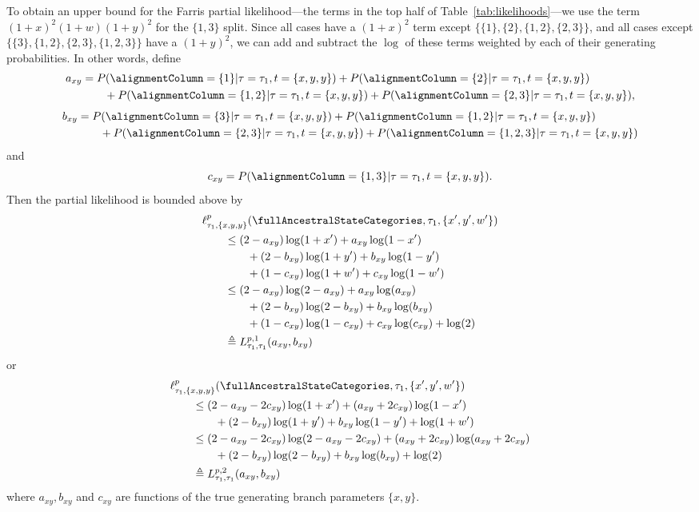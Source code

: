 To obtain an upper bound for the Farris partial likelihood---the terms in the top half of Table~\ref{tab:likelihoods}---we use the term $(1+x)^2(1+w)(1+y)^2$ for the $\{1,3\}$ split.
Since all cases have a $(1+x)^2$ term except $\{\{1\}, \{2\}, \{1,2\}, \{2,3\}\}$, and all cases except $\{\{3\}, \{1,2\}, \{2,3\}, \{1,2,3\}\}$ have a $(1+y)^2$, we can add and subtract the $\log$ of these terms weighted by each of their generating probabilities.
In other words, define
\begin{align*}
    a_{xy} &= P(\alignmentColumn=\{1\}|\tau=\tau_1,t=\{x,y,y\})
    +        P(\alignmentColumn=\{2\}|\tau=\tau_1,t=\{x,y,y\}) \\
    &\qquad + P(\alignmentColumn=\{1,2\}|\tau=\tau_1,t=\{x,y,y\})
    + P(\alignmentColumn=\{2,3\}|\tau=\tau_1,t=\{x,y,y\}),
\end{align*}
\begin{align*}
    b_{xy} &= P(\alignmentColumn=\{3\}|\tau=\tau_1,t=\{x,y,y\}) + P(\alignmentColumn=\{1,2\}|\tau=\tau_1,t=\{x,y,y\}) \\
           &\qquad + P(\alignmentColumn=\{2,3\}|\tau=\tau_1,t=\{x,y,y\}) + P(\alignmentColumn=\{1,2,3\}|\tau=\tau_1,t=\{x,y,y\})
\end{align*}
and
\begin{equation*}
    c_{xy} = P(\alignmentColumn=\{1,3\}|\tau=\tau_1,t=\{x,y,y\}).
\end{equation*}
Then the partial likelihood is bounded above by
\begin{align*}
    & \ell^p_{\tau_1,\{x,y,y\}}(\fullAncestralStateCategories,\tau_1,\{x',y',w'\}) \\
    &\qquad \le (2-a_{xy})\log(1+x')+a_{xy}\log(1-x')\\
    &\qquad \qquad +(2-b_{xy})\log(1+y')+b_{xy}\log(1-y')\\
    &\qquad \qquad +(1-c_{xy})\log(1+w')+c_{xy}\log(1-w') \\
    &\qquad \le (2-a_{xy})\log(2-a_{xy})+a_{xy}\log(a_{xy})\\
    &\qquad \qquad +(2-b_{xy})\log(2-b_{xy})+b_{xy}\log(b_{xy})\\
    &\qquad \qquad +(1-c_{xy})\log(1-c_{xy})+c_{xy}\log(c_{xy})+\log(2) \\
    &\qquad \triangleq L^{p,1}_{\tau_1,\tau_1}(a_{xy}, b_{xy})
\end{align*}
or
\begin{align*}
    & \ell^p_{\tau_1,\{x,y,y\}}(\fullAncestralStateCategories,\tau_1,\{x',y',w'\}) \\
    &\qquad \le (2-a_{xy}-2c_{xy})\log(1+x')+(a_{xy}+2c_{xy})\log(1-x')\\
    &\qquad \qquad +(2-b_{xy})\log(1+y')+b_{xy}\log(1-y')+\log(1+w')\\
    &\qquad \le (2-a_{xy}-2c_{xy})\log(2-a_{xy}-2c_{xy})+(a_{xy}+2c_{xy})\log(a_{xy}+2c_{xy})\\
    &\qquad \qquad +(2-b_{xy})\log(2-b_{xy})+b_{xy}\log(b_{xy})+\log(2) \\
    &\qquad \triangleq L^{p,2}_{\tau_1,\tau_1}(a_{xy}, b_{xy})
\end{align*}
where $a_{xy},b_{xy}$ and $c_{xy}$ are functions of the true generating branch parameters $\{x,y\}$.

